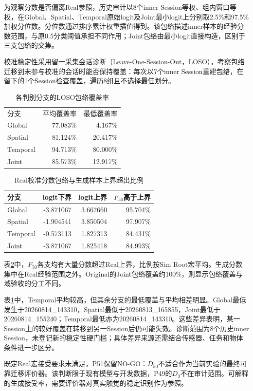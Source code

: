 为观察分数是否偏离Real参照，历史审计以8个inner Session等权、组内窗口等权，在Global、Spatial、Temporal原始logit及Joint最小logit上分别取2.5\%和97.5\%加权分位数。分位数通过排序累计权重插值得到。该包络描述inner样本的经验分数范围，与原0.5分类阈值承担不同作用；Joint包络由最小logit直接构造，区别于三支包络的交集。

校准稳定性采用留一采集会话诊断（Leave-One-Session-Out，LOSO），考察包络迁移到未参与校准的会话时能否保持覆盖：每次以7个inner Session重建包络，在留下的1个Session检查覆盖，遍历8组且不选择最佳划分。

\begin{table}[htbp]
\centering
\caption{各判别分支的LOSO包络覆盖率}
\label{tab:ch06_loso_envelope_coverage}
\begin{tabular}{lrr}
\toprule
分支 & 平均覆盖率 & 最低覆盖率\\
Global & 77.083\% & 4.167\%\\
Spatial & 81.124\% & 20.417\%\\
Temporal & 94.713\% & 80.000\%\\
Joint & 85.573\% & 12.917\%\\
\bottomrule
\end{tabular}
\end{table}

\begin{table}[htbp]
\centering
\caption{Real校准分数包络与生成样本上界超出比例}
\label{tab:ch06_score_envelope_diagnostic}
\begin{tabular}{lrrr}
\toprule
分支 & logit下界 & logit上界 & $F_{50}$高于上界\\
\midrule
Global & -3.871067 & 3.667660 & 95.704\%\\
Spatial & -1.904541 & 3.850504 & 97.907\%\\
Temporal & -0.573113 & 1.827313 & 84.431\%\\
Joint & -3.871067 & 1.825418 & 84.993\%\\
\bottomrule
\end{tabular}
\end{table}

表\ref{tab:ch06_score_envelope_diagnostic}中，$F_{50}$各支均有大量分数超过Real上界，比例按Sim Root宏平均。生成分数集中在Real经验范围之外。Original的Joint包络覆盖约100\%，则显示包络覆盖与域验收的分工不同。

表\ref{tab:ch06_loso_envelope_coverage}中，Temporal平均较高，但其余分支的最低覆盖与平均相差明显。Global最低发生于20260814\_143310，Spatial最低于20260813\_165855，Joint最低于20260814\_155240；Temporal最低亦为20260814\_143310。这些差异表明，某一Session上的较好覆盖在转移到另一Session后仍可能失效。诊断范围为8个历史inner Session，未登记新的稳定性硬门槛；具体差异来源还需结合传感器、任务和物体条件进一步区分。

既定Real宏接受要求未满足，P51保留NO-GO：$D_{50}$不适合作为当前实验的最终可靠迁移评价器。该判断限于现有模型与开发数据，P49的$D_3$不在审计范围。可解释的生成接受率，需要评价器对真实触觉的稳定识别作为参照。
